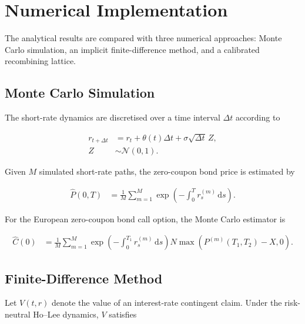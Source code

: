 \documentclass[11pt,a4paper]{article}
\newcommand{\dd}{\,\mathrm{d}}
\numberwithin{equation}{section}
\begin{document}
\section{Numerical Implementation}

The analytical results are compared with three numerical approaches:
Monte Carlo simulation, an implicit finite-difference method, and a
calibrated recombining lattice.


\subsection{Monte Carlo Simulation}

The short-rate dynamics are discretised over a time interval $\Delta t$
according to

\begin{align*}
    r_{t+\Delta t}
    &=
    r_t
    +
    \theta(t)\Delta t
    +
    \sigma\sqrt{\Delta t}\,Z,
    \\
    Z
    &\sim
    \mathcal{N}(0,1).
\end{align*}

Given $M$ simulated short-rate paths, the zero-coupon bond price is
estimated by

\begin{align*}
    \widehat{P}(0,T)
    &=
    \frac{1}{M}
    \sum_{m=1}^{M}
    \exp
    \left(
        -\int_0^T r_s^{(m)}\dd s
    \right).
\end{align*}

For the European zero-coupon bond call option, the Monte Carlo estimator
is

\begin{align*}
    \widehat{C}(0)
    &=
    \frac{1}{M}
    \sum_{m=1}^{M}
    \exp
    \left(
        -\int_0^{T_1}r_s^{(m)}\dd s
    \right)
    N
    \max
    \left(
        P^{(m)}(T_1,T_2)-X,
        0
    \right).
\end{align*}


\subsection{Finite-Difference Method}

Let $V(t,r)$ denote the value of an interest-rate contingent claim. Under
the risk-neutral Ho--Lee dynamics, $V$ satisfies
\end{document}

